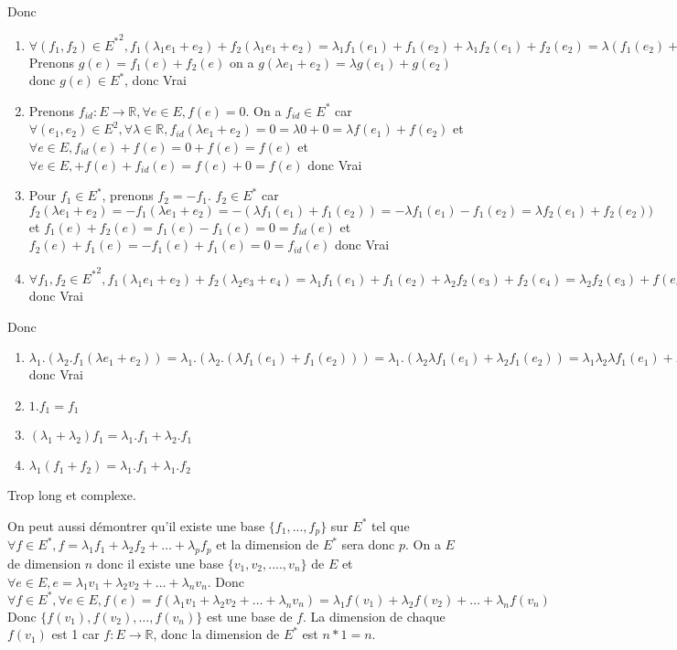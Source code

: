 \documentclass[]{book}
\theoremstyle{definition}
\newcommand{\bb}[1]{\mathbb{#1}}
\newcommand{\R}{\bb{R}}
\begin{document}
Donc
\begin{enumerate}
\item $\forall (f_1, f_2) \in {E^{*}}^2, f_1(\lambda_1 e_1 + e_2) + f_2(\lambda_1 e_1 + e_2) =  \lambda_1 f_1(e_1) + f_1(e_2) + \lambda_1 f_2(e_1) + f_2(e_2) = \lambda(f_1(e_2) + f_2(e_1)) + (f_1(e_2) + f_2(e_2))$ Prenons $g(e) = f_1(e) + f_2(e)$ on a $g(\lambda e_1 + e_2) = \lambda g(e_1) + g(e_2)$ donc $g(e) \in E^{*}$, donc Vrai
\item Prenons $f_{id} : E \to \R, \forall e \in E, f(e) = 0$. On a $f_{id} \in E^{*}$ car $\forall (e_1,e_2) \in E^2, \forall \lambda \in \R, f_{id}(\lambda e_1 + e_2) = 0 = \lambda 0 + 0 = \lambda f(e_1) + f(e_2)$ et $\forall e \in E, f_{id}(e) + f(e) = 0 + f(e) = f(e)$ et $\forall e \in E, + f(e) + f_{id}(e)= f(e) + 0 = f(e)$ donc Vrai
\item Pour $f_1 \in E^{*}$, prenons $f_2 = -f_1$. $f_2 \in E^{*}$ car $f_2(\lambda e_1 + e_2) = -f_1(\lambda e_1 + e_2) = -(\lambda f_1(e_1) + f_1(e_2)) = -\lambda f_1(e_1) - f_1(e_2) = \lambda f_2(e_1) + f_2(e_2))$ et $f_1(e) + f_2(e) = f_1(e) - f_1(e) = 0 = f_{id}(e)$ et $f_2(e) + f_1(e) = -f_1(e) + f_1(e) = 0 = f_{id}(e)$ donc Vrai
\item $\forall f_1, f_2 \in {E^{*}}^2, f_1(\lambda_1 e_1 + e_2) + f_2(\lambda_2 e_3 + e_4) = \lambda_1 f_1(e_1) + f_1(e_2) + \lambda_2 f_2(e_3) + f_2(e_4) =  \lambda_2 f_2(e_3) + f(e_4) + \lambda_1 f_1(e_1) + f_1(e_2) = f_2(\lambda_2 e_3 + e_4) + f_1(\lambda_1 e_1 + e_2)$ donc Vrai
\end{enumerate}


Donc
\begin {enumerate}
\item $\lambda_1.(\lambda_2 . f_1(\lambda e_1 + e_2)) = \lambda_1.(\lambda_2 . (\lambda f_1(e_1) + f_1(e_2))) = \lambda_1.( \lambda_2 \lambda f_1(e_1) + \lambda_2 f_1(e_2)) = \lambda_1 \lambda_2 \lambda f_1(e_1) + \lambda_1 \lambda_2 f_1(e_2) = (\lambda_1 \lambda_2) . (\lambda f_1(e_1) + f_1(e_2)) = (\lambda_1 \lambda_2) . f_1(\lambda e_1 + e_2))$ donc Vrai
\item $1 . f_1 = f_1$
\item $(\lambda_1 + \lambda_2) f_1 = \lambda_1 . f_1 + \lambda_2 . f_1 $
\item $\lambda_1 ( f_1 + f_2) = \lambda_1 . f_1 + \lambda_1 . f_2$
\end{enumerate}

Trop long et complexe. 


On peut aussi d\'emontrer qu'il existe une base $\{f_1, ..., f_p\}$ sur $E^{*}$ tel que $\forall f \in E^{*}, f = \lambda_1 f_1 + \lambda_2 f_2 + \ldots + \lambda_p f_p$ et la dimension de $E^{*}$ sera donc $p$. On a $E$ de dimension $n$ donc il existe une base $\{v_1, v_2, ...., v_n\}$ de $E$ et $\forall e \in E, e = \lambda_1 v_1 + \lambda_2 v_2 + \ldots + \lambda_n v_n$. Donc $\forall f \in E^{*}, \forall e \in E, f(e) = f(\lambda_1 v_1 + \lambda_2 v_2 + \ldots + \lambda_n v_n) = \lambda_1 f(v_1) + \lambda_2 f(v_2) + \ldots + \lambda_n f(v_n)$ Donc $\{f(v_1), f(v_2), \ldots, f(v_n)\}$ est une base de $f$. La dimension de chaque $f(v_1)$ est 1 car $f:E \to \R$, donc la dimension de $E^{*}$ est $n*1 = n$.
\end{document}
